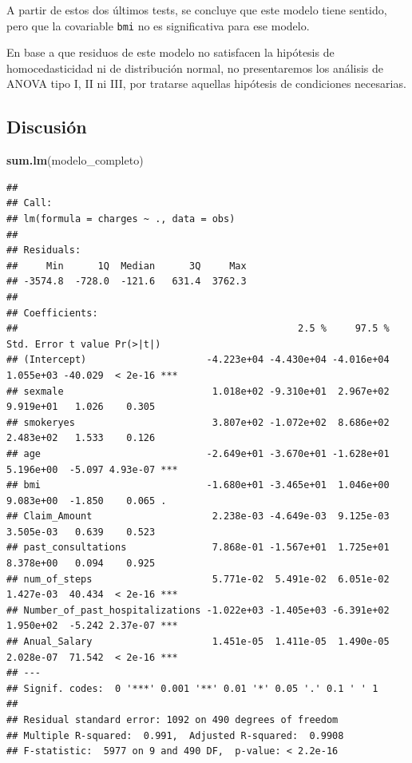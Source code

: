 \documentclass[
]{article}
\newenvironment{Shaded}{\begin{snugshade}}{\end{snugshade}}
\newcommand{\FunctionTok}[1]{\textcolor[rgb]{0.13,0.29,0.53}{\textbf{#1}}}
\newcommand{\NormalTok}[1]{#1}
\begin{document}
A partir de estos dos últimos tests, se concluye que este modelo tiene
sentido, pero que la covariable \texttt{bmi} no es significativa para
ese modelo.

En base a que residuos de este modelo no satisfacen la hipótesis de
homocedasticidad ni de distribución normal, no presentaremos los
análisis de ANOVA tipo I, II ni III, por tratarse aquellas hipótesis de
condiciones necesarias.

\subsection{Discusión}\label{discusiuxf3n}

\begin{Shaded}
\begin{Highlighting}[]
\FunctionTok{sum.lm}\NormalTok{(modelo\_completo)}
\end{Highlighting}
\end{Shaded}

\begin{verbatim}
## 
## Call:
## lm(formula = charges ~ ., data = obs)
## 
## Residuals:
##     Min      1Q  Median      3Q     Max 
## -3574.8  -728.0  -121.6   631.4  3762.3 
## 
## Coefficients:
##                                                 2.5 %     97.5 % Std. Error t value Pr(>|t|)    
## (Intercept)                     -4.223e+04 -4.430e+04 -4.016e+04  1.055e+03 -40.029  < 2e-16 ***
## sexmale                          1.018e+02 -9.310e+01  2.967e+02  9.919e+01   1.026    0.305    
## smokeryes                        3.807e+02 -1.072e+02  8.686e+02  2.483e+02   1.533    0.126    
## age                             -2.649e+01 -3.670e+01 -1.628e+01  5.196e+00  -5.097 4.93e-07 ***
## bmi                             -1.680e+01 -3.465e+01  1.046e+00  9.083e+00  -1.850    0.065 .  
## Claim_Amount                     2.238e-03 -4.649e-03  9.125e-03  3.505e-03   0.639    0.523    
## past_consultations               7.868e-01 -1.567e+01  1.725e+01  8.378e+00   0.094    0.925    
## num_of_steps                     5.771e-02  5.491e-02  6.051e-02  1.427e-03  40.434  < 2e-16 ***
## Number_of_past_hospitalizations -1.022e+03 -1.405e+03 -6.391e+02  1.950e+02  -5.242 2.37e-07 ***
## Anual_Salary                     1.451e-05  1.411e-05  1.490e-05  2.028e-07  71.542  < 2e-16 ***
## ---
## Signif. codes:  0 '***' 0.001 '**' 0.01 '*' 0.05 '.' 0.1 ' ' 1
## 
## Residual standard error: 1092 on 490 degrees of freedom
## Multiple R-squared:  0.991,  Adjusted R-squared:  0.9908 
## F-statistic:  5977 on 9 and 490 DF,  p-value: < 2.2e-16
\end{verbatim}
\end{document}
